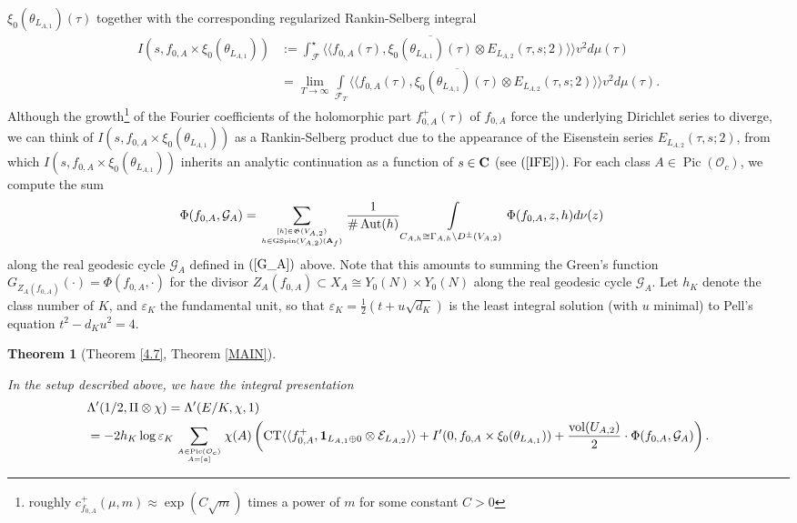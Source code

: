 \documentclass{amsart}
\newtheorem{theorem}{Theorem}[section]
\theoremstyle{definition}
\begin{document}
$\xi_0(\theta_{L_{A,1}})(\tau)$ together with the corresponding regularized Rankin-Selberg integral 
\begin{equation}\begin{aligned}\label{regint}  I(s, f_{0, A} \times \xi_0(\theta_{L_{A,1}})) &:=
\int_{\mathcal{F}}^{\star} \langle \langle f_{0, A}(\tau), \overline{\xi_0(\theta_{L_{A,1}})(\tau)} \otimes E_{L_{A,2}}(\tau, s; 2) \rangle \rangle v^2 d \mu (\tau) \\
&= \lim_{T \rightarrow \infty} \int\limits_{\mathcal{F}_T}  
\langle \langle f_{0, A}(\tau), \overline{\xi_0(\theta_{L_{A,1}})(\tau)} \otimes E_{L_{A,2}}(\tau, s; 2) \rangle \rangle v^2 d \mu(\tau). \end{aligned}\end{equation}
Although the growth\footnote{roughly $c_{f_{0,A}}^+(\mu, m) \approx \exp(C \sqrt{m})$ times a power of $m$ for some constant $C>0$}  
of the Fourier coefficients of the holomorphic part $f_{0,A}^+(\tau)$ of $f_{0,A}$ force the underlying Dirichlet series to diverge, 
we can think of $I(s, f_{0,A} \times \xi_0(\theta_{L_{A,1}}))$ as a Rankin-Selberg product due to the appearance of the Eisenstein series $E_{L_{A,2}}(\tau, s; 2)$, 
from which  $I(s, f_{0,A} \times \xi_0(\theta_{L_{A,1}}))$ inherits an analytic continuation as a function of $s \in {\bf{C}}$ (see $(\ref{IFE})$). 
For each class $A \in \operatorname{Pic}(\mathcal{O}_c)$, we compute the sum
\begin{align}\label{sumG_A} \Phi(f_{0, A}, \mathcal{G}_A ) &= \sum\limits_{  [h] \in \mathfrak{G}(V_{A,2}) \atop h \in \operatorname{GSpin}(V_{A,2})({\bf{A}}_f) }
\frac{1}{\# \operatorname{Aut}(h)} \int\limits_{  C_{A,h} \cong \Gamma_{A,h} \backslash D^{\pm}(V_{A,2}) } \Phi(f_{0, A}, z, h) d \nu (z) \end{align}
along the real geodesic cycle $\mathcal{G}_A$ defined in $(\ref{G_A})$ above. Note that this amounts to summing the Green's function
$G_{Z_A(f_{0,A})}(\cdot) = \Phi(f_{0, A}, \cdot)$ for the divisor $Z_A(f_{0,A}) \subset X_A \cong Y_0(N) \times Y_0(N)$ along the real geodesic cycle $\mathcal{G}_A$.
Let $h_K$ denote the class number of $K$, and $\varepsilon_K$ the fundamental unit, 
so that $\varepsilon_K = \frac{1}{2}(t + u \sqrt{d_K})$ is the least integral solution (with $u$ minimal) to Pell's equation $t^2 - d_K u^2 = 4$.

\begin{theorem}[Theorem \ref{4.7}, Theorem \ref{MAIN}]\label{sumform}

In the setup described above, we have the integral presentation
\begin{align*} &\Lambda'(1/2, \Pi \otimes \chi) = \Lambda'(E/K, \chi, 1) \\ &= - 2 h_K \log \varepsilon_K 
\sum\limits_{ A \in \operatorname{Pic}(\mathcal{O}_c) \atop A = [\mathfrak{a}] } \chi(A)
 \left( \operatorname{CT} \langle \langle f^+_{0, A}, {\bf{1}}_{L_{A,1} \oplus 0} \otimes \mathcal{E}_{L_{A,2}} \rangle \rangle
+ I'(0, f_{0, A} \times \xi_0(\theta_{L_{A,1}}))+\frac{\operatorname{vol}(U_{A, 2})}{2} \cdot \Phi(f_{0, A}, \mathcal{G}_A) \right). \end{align*} \end{theorem}
\end{document}
